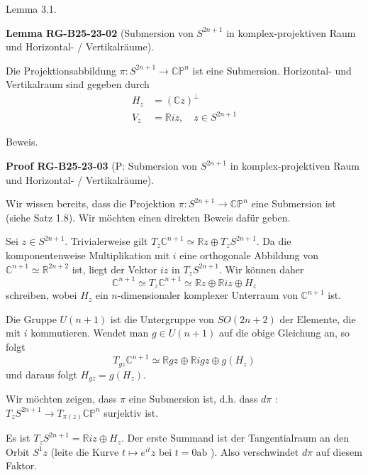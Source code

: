 \documentclass[10pt, letterpaper]{article}
\newcommand{\CustomHeading}[3]{%
  \par\medskip\noindent%
  \textbf{#1 #2} \textnormal{(#3)}.\enskip%
}
\newenvironment{LEM}[2]{\begin{unitbox}\CustomHeading{Lemma}{#1}{#2}}{\end{unitbox}}
\newenvironment{PROOF}[2]{\begin{unitbox}\CustomHeading{Proof}{#1}{#2}}{\end{unitbox}}
\begin{document}
Lemma 3.1. 

\begin{LEM}{RG-B25-23-02}{Submersion von $S^{2n+1}$ in komplex-projektiven Raum und Horizontal- / Vertikalräume}
Die Projektionsabbildung $\pi: S^{2 n+1} \rightarrow \mathbb{C P}^{n}$ ist eine Submersion. Horizontal- und Vertikalraum sind gegeben durch
$$
\begin{aligned}
H_{z} & =(\mathbb{C} z)^{\perp} \\
V_{z} & =\mathbb{R} i z, \quad z \in S^{2 n+1}
\end{aligned}
$$
\end{LEM}

Beweis. 

\begin{PROOF}{RG-B25-23-03}{P: Submersion von $S^{2n+1}$ in komplex-projektiven Raum und Horizontal- / Vertikalräume}
Wir wissen bereits, dass die Projektion $\pi: S^{2 n+1} \rightarrow \mathbb{C} \mathbb{P}^{n}$ eine Submersion ist (siehe Satz 1.8). Wir möchten einen direkten Beweis dafür geben.

Sei $z \in S^{2 n+1}$. Trivialerweise gilt $T_{z} \mathbb{C}^{n+1} \simeq \mathbb{R} z \oplus T_{z} S^{2 n+1}$. Da die komponentenweise Multiplikation mit $i$ eine orthogonale Abbildung von $\mathbb{C}^{n+1} \simeq \mathbb{R}^{2 n+2}$ ist, liegt der Vektor $i z$ in $T_{z} S^{2 n+1}$. Wir können daher
$$
\mathbb{C}^{n+1} \simeq T_{z} \mathbb{C}^{n+1} \simeq \mathbb{R} z \oplus \mathbb{R} i z \oplus H_{z}
$$
schreiben, wobei $H_{z}$ ein $n$-dimensionaler komplexer Unterraum von $\mathbb{C}^{n+1}$ ist.

Die Gruppe $U(n+1)$ ist die Untergruppe von $S O(2 n+2)$ der Elemente, die mit $i$ kommutieren. Wendet man $g \in U(n+1)$ auf die obige Gleichung an, so folgt
$$
T_{g z} \mathbb{C}^{n+1} \simeq \mathbb{R} g z \oplus \mathbb{R} i g z \oplus g\left(H_{z}\right)
$$
und daraus folgt $H_{g z}=g\left(H_{z}\right)$.

Wir möchten zeigen, dass $\pi$ eine Submersion ist, d.h. dass $d \pi$ : $T_{z} S^{2 n+1} \rightarrow T_{\pi(z)} \mathbb{C P}^{n}$ surjektiv ist.

Es ist $T_{z} S^{2 n+1}=\mathbb{R} i z \oplus H_{z}$. Der erste Summand ist der Tangentialraum an den Orbit $S^{1} z$ (leite die Kurve $t \mapsto e^{i t} z$ bei $t=0 \mathrm{ab}$ ). Also verschwindet $d \pi$ auf diesem Faktor.


\end{PROOF}
\end{document}
